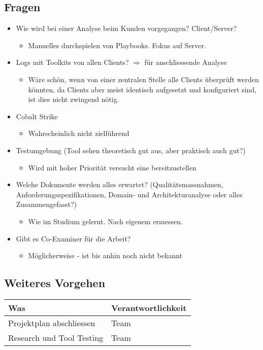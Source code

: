 \subsection*{Fragen}
\begin{itemize}
    \item Wie wird bei einer Analyse beim Kunden vorgegangen? Client/Server?
    \begin{itemize}
        \item Manuelles durchspielen von Playbooks. Fokus auf Server.
    \end{itemize}
    \item Logs mit Toolkits von allen Clients? $\Rightarrow$ für anschliessende Analyse 
    \begin{itemize}
        \item Wäre schön, wenn von einer zentralen Stelle alle Clients überprüft werden könnten, da Clients aber meist identisch aufgesetzt und konfiguriert sind, ist dies nicht zwingend nötig.
    \end{itemize}
    \item Cobalt Strike
    \begin{itemize}
        \item Wahrscheinlich nicht zielführend
    \end{itemize}
    \item Testumgebung (Tool sehen theoretisch gut aus, aber praktisch auch gut?)
    \begin{itemize}
        \item Wird mit hoher Priorität versucht eine bereitzustellen
    \end{itemize}
    \item Welche Dokumente werden alles erwartet? (Qualitätsmassnahmen, Anforderungsspezifikationen, Domain- und Architekturanalyse oder alles Zusammengefasst?)
    \begin{itemize}
        \item Wie im Studium gelernt. Nach eigenem ermessen.
    \end{itemize}
    \item Gibt es Co-Examiner für die Arbeit?
    \begin{itemize}
        \item Möglicherweise - ist bis anhin noch nicht bekannt
    \end{itemize}
\end{itemize}

\vspace{1cm}

\subsection*{Weiteres Vorgehen}
\begin{table}[H]
    \centering
    \begin{tabular}{p{12cm} p{4cm}}
        \textbf{Was} & \textbf{Verantwortlichkeit} \\ \hline
        Projektplan abschliessen & Team \\ \hline
        Research und Tool Testing & Team \\ \hline
    \end{tabular}
\end{table}

